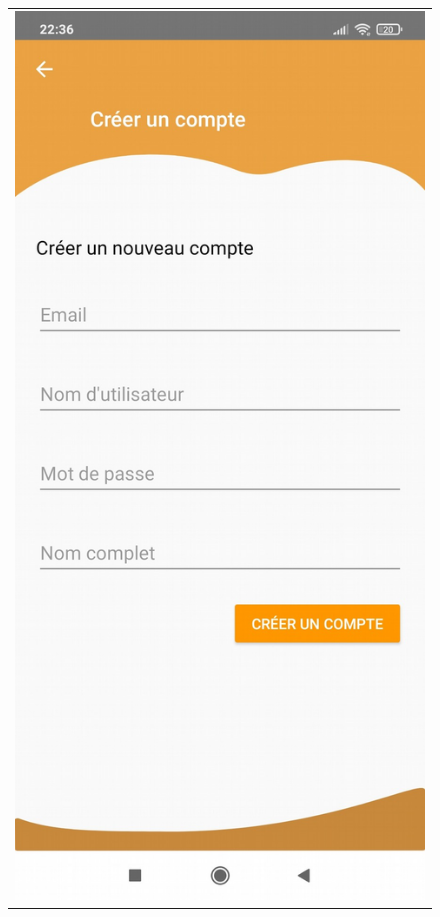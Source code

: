 \documentclass{article}
\begin{document}
\begin{figure}
\begin{tabular}{@{}c@{}}
    \end{tabular}
    \begin{tabular}{@{}c@{}}
        \includegraphics[scale=0.152]{creer_compte.png}
    \end{tabular}
\end{figure}
\end{document}
